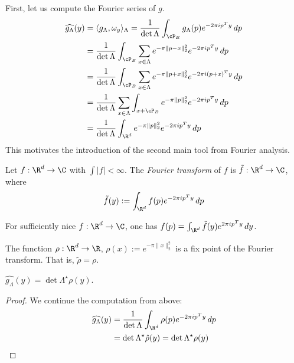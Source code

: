 First, let us compute the Fourier series of $g$.
\begin{align*}
  \widehat{g_\Lambda}(y) &= \langle g_\Lambda, \omega_y \rangle_\Lambda
    = \frac{1}{\det\Lambda} \int_{\cP_B} g_\Lambda(p) e^{-2\pi i p^T y} \,dp \\
    &= \frac{1}{\det\Lambda} \int_{\cP_B} \sum_{x \in \Lambda} e^{-\pi \|p - x\|_2^2} e^{-2\pi i p^T y} \,dp \\
    &= \frac{1}{\det\Lambda} \int_{\cP_B} \sum_{x \in \Lambda} e^{-\pi \|p + x\|_2^2} e^{-2\pi i (p + x)^T y} \,dp \\
    &= \frac{1}{\det\Lambda} \sum_{x \in \Lambda} \int_{x + \cP_B} e^{-\pi \|p\|_2^2} e^{-2\pi i p^T y} \,dp \\
    &= \frac{1}{\det\Lambda} \int_{\R^d} e^{-\pi \|p\|_2^2} e^{-2\pi i p^T y} \,dp
\end{align*}
This motivates the introduction of the second main tool from Fourier analysis.

\begin{definition}
  Let $f:\R^d \to \C$ with $\int |f| < \infty$.
  The \emph{Fourier transform} of $f$ is $\tilde f: \R^d \to \C$, where
  \[
    \tilde f(y) := \int_{\R^d} f(p) e^{-2\pi i p^Ty} \,dp
  \]
\end{definition}
\begin{theorem}
  For sufficiently nice $f: \R^d \to \C$, one has $f(p) = \int_{\R^d} \tilde f(y) e^{2\pi i p^Ty} \,dy$.
\end{theorem}

\begin{fact}
  The function $\rho: \R^d \to \R$, $\rho(x) := e^{-\pi \|x\|_2^2}$
  is a fix point of the Fourier transform.
  That is, $\tilde \rho = \rho$.
\end{fact}

\begin{lemma}
  \label{lemma:fourier-coeff-g}
  $\widehat{g_\Lambda}(y) = \det\Lambda^\star \rho(y)$.
\end{lemma}
\begin{proof}
  We continue the computation from above:
  \begin{align*}
    \widehat{g_\Lambda}(y) &= \frac{1}{\det\Lambda} \int_{\R^d} \rho(p) e^{-2\pi i p^T y} \,dp \\
      &= \det\Lambda^\star \hat\rho(y) = \det\Lambda^\star \rho(y) \qedhere
  \end{align*}
\end{proof}

